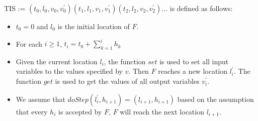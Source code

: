 TIS := $(t_{0},l_{0},v_{0},v_{0}^{\prime})(t_{1},l_{1},v_{1},v_{1}^{\prime})(t_{2},l_{2},v_{2},v_{2}^{\prime})...$ is
defined as follows:
\begin{itemize}
\item
$t_{0} = 0$ and $l_{0}$ is the initial location of $F$.
\item
For each $i \geqslant 1$, $t_{i} = t_{0} + \sum_{k = 1}^i h_{k}$
\item
Given the current location $l_{i}$, the function $set$ is used to set all input variables to the values specified by $v$. Then $F$ reaches a new location $l_{i}^{\prime}$. The function $get$ is used to get the values of all output variables $v_{i}^{\prime}$.
\item 
We assume that $doStep(l_{i}^{\prime}, h_{i+1}) = (l_{i+1},h_{i+1})$ based on the assumption that every $h_{i}$ is accepted by $F$, $F$ will reach the next location $l_{i+1}$.
\end{itemize}

